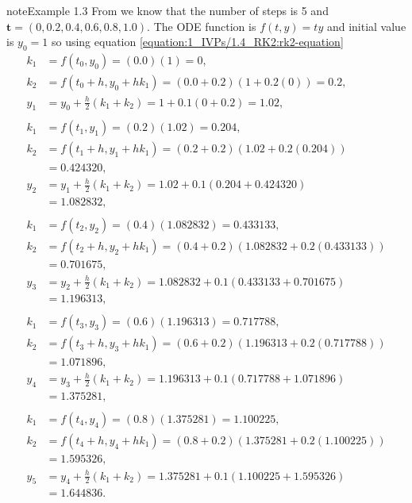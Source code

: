 \documentclass[letterpaper,10pt,english]{jupyterBook}
\begin{document}
\begin{sphinxadmonition}{note}{Example 1.3}
\sphinxAtStartPar
From {\hyperref[\detokenize{1_IVPs/1.2_Euler_Method:euler-example}]{}} we know that the number of steps is 5 and \(\mathbf{t} = (0, 0.2, 0.4, 0.6, 0.8, 1.0).\) The ODE function is \(f(t, y) = t y\) and initial value is \(y_0 = 1\) so using equation \eqref{equation:1_IVPs/1.4_RK2:rk2-equation}
\begin{align*}
    k_1 &= f(t_0, y_0) = (0.0)(1) = 0, \\
    k_2 &= f(t_0 + h, y_0 + hk_1) = (0.0 + 0.2)(1 + 0.2(0)) = 0.2, \\
    y_1 &= y_0 + \frac{h}{2}(k_1 + k_2) = 1 + 0.1(0 + 0.2) = 1.02, \\ \\
    k_1 &= f(t_1, y_1) = (0.2)(1.02) = 0.204, \\
    k_2 &= f(t_1 + h, y_1 + hk_1) = (0.2 + 0.2)(1.02 + 0.2(0.204)) \\
    &= 0.424320, \\
    y_2 &= y_1 + \frac{h}{2}(k_1 + k_2) = 1.02 + 0.1(0.204 + 0.424320) \\
    &= 1.082832, \\ \\
    k_1 &= f(t_2, y_2) = (0.4)(1.082832) = 0.433133, \\
    k_2 &= f(t_2 + h, y_2 + hk_1) = (0.4 + 0.2)(1.082832 + 0.2(0.433133)) \\
    &= 0.701675, \\
    y_3 &= y_2 + \frac{h}{2}(k_1 + k_2) = 1.082832 + 0.1(0.433133 + 0.701675) \\
    &= 1.196313, \\ \\
    k_1 &= f(t_3, y_3) = (0.6)(1.196313) = 0.717788, \\
    k_2 &= f(t_3 + h, y_3 + hk_1) = (0.6 + 0.2)(1.196313 + 0.2(0.717788)) \\
    &= 1.071896, \\
    y_4 &= y_3 + \frac{h}{2}(k_1 + k_2) = 1.196313 + 0.1(0.717788 + 1.071896) \\
    &= 1.375281, \\ \\
    k_1 &= f(t_4, y_4) = (0.8)(1.375281) = 1.100225, \\
    k_2 &= f(t_4 + h, y_4 + hk_1) = (0.8 + 0.2)(1.375281 + 0.2(1.100225)) \\
    &= 1.595326, \\
    y_5 &= y_4 + \frac{h}{2}(k_1 + k_2) = 1.375281 + 0.1(1.100225 + 1.595326) \\
    &= 1.644836.
\end{align*}\end{sphinxadmonition}
\end{document}
